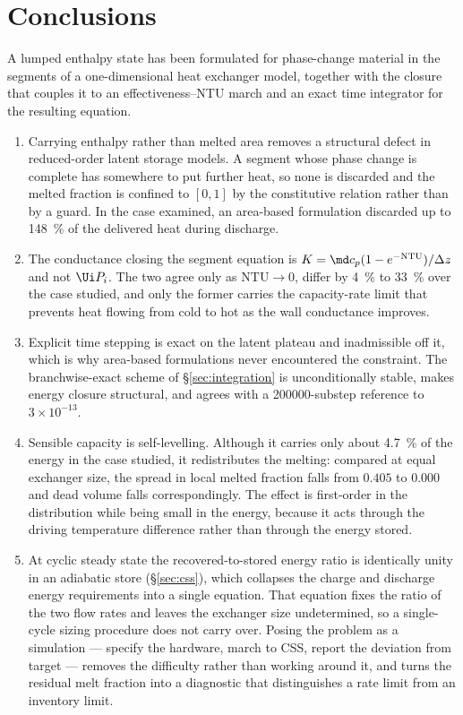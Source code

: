 \section{Conclusions}
\label{sec:conclusions}

A lumped enthalpy state has been formulated for phase-change material in the
segments of a one-dimensional heat exchanger model, together with the closure
that couples it to an effectiveness--NTU march and an exact time integrator for
the resulting equation.

\begin{enumerate}[leftmargin=1.8em,itemsep=3pt]
\item Carrying enthalpy rather than melted area removes a structural defect in
  reduced-order latent storage models. A segment whose phase change is complete
  has somewhere to put further heat, so none is discarded and the melted
  fraction is confined to $[0,1]$ by the constitutive relation rather than by a
  guard. In the case examined, an area-based formulation discarded up to
  \SI{148}{\percent} of the delivered heat during discharge.
\item The conductance closing the segment equation is
  $K=\md c_{p}(1-e^{-\mathrm{NTU}})/\Delta z$ and not $\Ui P_{i}$. The two agree
  only as $\mathrm{NTU}\to0$, differ by \SI{4}{\percent} to \SI{33}{\percent}
  over the case studied, and only the former carries the capacity-rate limit
  that prevents heat flowing from cold to hot as the wall conductance improves.
\item Explicit time stepping is exact on the latent plateau and inadmissible off
  it, which is why area-based formulations never encountered the constraint. The
  branchwise-exact scheme of \S\ref{sec:integration} is unconditionally stable,
  makes energy closure structural, and agrees with a \num{200000}-substep
  reference to $3\times10^{-13}$.
\item Sensible capacity is self-levelling. Although it carries only about
  \SI{4.7}{\percent} of the energy in the case studied, it redistributes the
  melting: compared at equal exchanger size, the spread in local melted fraction
  falls from $0.405$ to $0.000$ and dead volume falls correspondingly. The
  effect is first-order in the distribution while being small in the energy,
  because it acts through the driving temperature difference rather than through
  the energy stored.
\item At cyclic steady state the recovered-to-stored energy ratio is identically
  unity in an adiabatic store (\S\ref{sec:css}), which collapses the charge and
  discharge energy requirements into a single equation. That equation fixes the
  ratio of the two flow rates and leaves the exchanger size undetermined, so a
  single-cycle sizing procedure does not carry over. Posing the problem as a
  simulation --- specify the hardware, march to CSS, report the deviation from
  target --- removes the difficulty rather than working around it, and turns the
  residual melt fraction into a diagnostic that distinguishes a rate limit from
  an inventory limit.
\end{enumerate}

